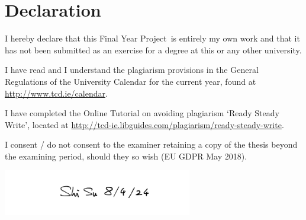 \documentclass[a4paper,oneside,12pt]{book}
\title{\thesistitle}
\author{\authorname}
\newcommand{\typeofthesis}{Final Year Project} %
\begin{document}

\section*{\Huge\textcolor{tcd_blue}{Declaration}}
\vspace{1cm}
I hereby declare that this \typeofthesis\ is entirely my own work and that it has not been submitted as an exercise for a degree at this or any other university.

\vspace{1cm}
I have read and I understand the plagiarism provisions in the General Regulations of the University Calendar for the current year, found at \url{http://www.tcd.ie/calendar}.
\vspace{1cm}

I have completed the Online Tutorial on avoiding plagiarism `Ready Steady Write', located at \url{http://tcd-ie.libguides.com/plagiarism/ready-steady-write}.
\vspace{1cm}

I consent / do not consent to the examiner retaining a copy of the thesis beyond the examining period, should they so wish (EU GDPR May 2018).
\vspace{1cm}


\hfill\includegraphics[height=2cm]{signature.png}
\end{document}
